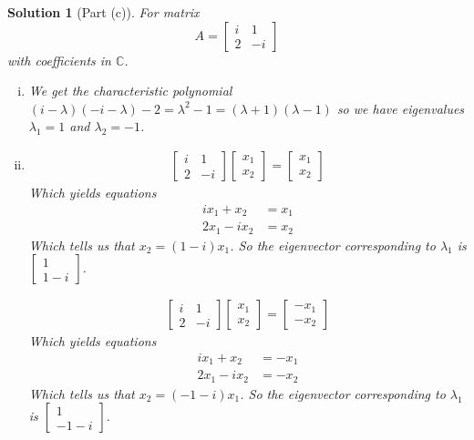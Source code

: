 \documentclass[leqno]{article}
\theoremstyle{nonumberplain}
\newtheorem{solution}{Solution}
\begin{document}
\begin{solution}[Part (c)] For matrix
\[A=\begin{bmatrix}
i & 1\\
2 & -i
\end{bmatrix}
\]
with coefficients in $\mathbb{C}$.

\begin{enumerate}[i)]
\item We get the characteristic polynomial $(i-\lambda)(-i-\lambda)-2=\lambda^2-1=(\lambda+1)(\lambda-1)$ so we have eigenvalues $\lambda_1=1$ and $\lambda_2=-1$.

\item 
\begin{align*}
\begin{bmatrix}
i & 1\\
2 & -i
\end{bmatrix}
\begin{bmatrix}
x_1\\
x_2
\end{bmatrix}
=\begin{bmatrix}
x_1\\
x_2
\end{bmatrix}
\end{align*}
Which yields equations
\begin{align*}
ix_1+x_2&=x_1\\
2x_1-ix_2&=x_2
\end{align*}
Which tells us that $x_2=(1-i)x_1$.  So the eigenvector corresponding to $\lambda_1$ is $\begin{bmatrix}
1\\
1-i\end{bmatrix}$.

\begin{align*}
\begin{bmatrix}
i & 1\\
2 & -i
\end{bmatrix}
\begin{bmatrix}
x_1\\
x_2
\end{bmatrix}
=\begin{bmatrix}
-x_1\\
-x_2
\end{bmatrix}
\end{align*}
Which yields equations
\begin{align*}
ix_1+x_2&=-x_1\\
2x_1-ix_2&=-x_2
\end{align*}
Which tells us that $x_2=(-1-i)x_1$.  So the eigenvector corresponding to $\lambda_1$ is $\begin{bmatrix}
1\\
-1-i \end{bmatrix}$.


\end{enumerate}
\end{solution}
\end{document}
